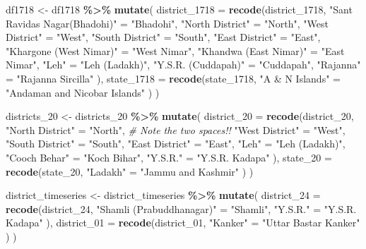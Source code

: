 \documentclass[
]{article}
\newenvironment{Shaded}{\begin{snugshade}}{\end{snugshade}}
\newcommand{\AttributeTok}[1]{\textcolor[rgb]{0.13,0.29,0.53}{#1}}
\newcommand{\CommentTok}[1]{\textcolor[rgb]{0.56,0.35,0.01}{\textit{#1}}}
\newcommand{\FunctionTok}[1]{\textcolor[rgb]{0.13,0.29,0.53}{\textbf{#1}}}
\newcommand{\NormalTok}[1]{#1}
\newcommand{\OtherTok}[1]{\textcolor[rgb]{0.56,0.35,0.01}{#1}}
\newcommand{\SpecialCharTok}[1]{\textcolor[rgb]{0.81,0.36,0.00}{\textbf{#1}}}
\newcommand{\StringTok}[1]{\textcolor[rgb]{0.31,0.60,0.02}{#1}}
\begin{document}
\begin{Shaded}
\begin{Highlighting}[]
\NormalTok{df1718 }\OtherTok{\textless{}{-}}\NormalTok{ df1718 }\SpecialCharTok{\%\textgreater{}\%}
  \FunctionTok{mutate}\NormalTok{(}
    \AttributeTok{district\_1718 =} \FunctionTok{recode}\NormalTok{(district\_1718,}
      \StringTok{"Sant Ravidas Nagar(Bhadohi)"} \OtherTok{=} \StringTok{"Bhadohi"}\NormalTok{,}
      \StringTok{"North District"} \OtherTok{=} \StringTok{"North"}\NormalTok{,}
      \StringTok{"West District"} \OtherTok{=} \StringTok{"West"}\NormalTok{,}
      \StringTok{"South District"} \OtherTok{=} \StringTok{"South"}\NormalTok{,}
      \StringTok{"East District"} \OtherTok{=} \StringTok{"East"}\NormalTok{,}
      \StringTok{"Khargone (West Nimar)"} \OtherTok{=} \StringTok{"West Nimar"}\NormalTok{,}
      \StringTok{"Khandwa (East Nimar)"} \OtherTok{=} \StringTok{"East Nimar"}\NormalTok{,}
      \StringTok{"Leh"} \OtherTok{=} \StringTok{"Leh (Ladakh)"}\NormalTok{,}
      \StringTok{"Y.S.R. (Cuddapah)"} \OtherTok{=} \StringTok{"Cuddapah"}\NormalTok{,}
      \StringTok{"Rajanna"} \OtherTok{=} \StringTok{"Rajanna Sircilla"}
\NormalTok{      ),}
    \AttributeTok{state\_1718 =} \FunctionTok{recode}\NormalTok{(state\_1718,}
      \StringTok{"A \& N Islands"} \OtherTok{=} \StringTok{"Andaman and Nicobar Islands"}
\NormalTok{      )}
\NormalTok{    )}


\NormalTok{districts\_20 }\OtherTok{\textless{}{-}}\NormalTok{ districts\_20 }\SpecialCharTok{\%\textgreater{}\%}
  \FunctionTok{mutate}\NormalTok{(}
    \AttributeTok{district\_20 =} \FunctionTok{recode}\NormalTok{(district\_20,}
      \StringTok{"North  District"} \OtherTok{=} \StringTok{"North"}\NormalTok{, }\CommentTok{\# Note the two spaces!!}
      \StringTok{"West District"} \OtherTok{=} \StringTok{"West"}\NormalTok{,}
      \StringTok{"South District"} \OtherTok{=} \StringTok{"South"}\NormalTok{,}
      \StringTok{"East District"} \OtherTok{=} \StringTok{"East"}\NormalTok{,}
      \StringTok{"Leh"} \OtherTok{=} \StringTok{"Leh (Ladakh)"}\NormalTok{,}
      \StringTok{"Cooch Behar"} \OtherTok{=} \StringTok{"Koch Bihar"}\NormalTok{,}
      \StringTok{"Y.S.R."} \OtherTok{=} \StringTok{"Y.S.R. Kadapa"}
\NormalTok{      ),}
    \AttributeTok{state\_20 =} \FunctionTok{recode}\NormalTok{(state\_20,}
      \StringTok{"Ladakh"} \OtherTok{=} \StringTok{"Jammu and Kashmir"}
\NormalTok{      )}
\NormalTok{    )}


\NormalTok{district\_timeseries }\OtherTok{\textless{}{-}}\NormalTok{ district\_timeseries }\SpecialCharTok{\%\textgreater{}\%}
  \FunctionTok{mutate}\NormalTok{(}
    \AttributeTok{district\_24 =} \FunctionTok{recode}\NormalTok{(district\_24,}
      \StringTok{"Shamli (Prabuddhanagar)"} \OtherTok{=} \StringTok{"Shamli"}\NormalTok{,}
      \StringTok{"Y.S.R."} \OtherTok{=} \StringTok{"Y.S.R. Kadapa"}
\NormalTok{      ),}
    \AttributeTok{district\_01 =} \FunctionTok{recode}\NormalTok{(district\_01,}
      \StringTok{"Kanker"} \OtherTok{=} \StringTok{"Uttar Bastar Kanker"}
\NormalTok{      )}
\NormalTok{    )}



\end{Highlighting}
\end{Shaded}
\end{document}
